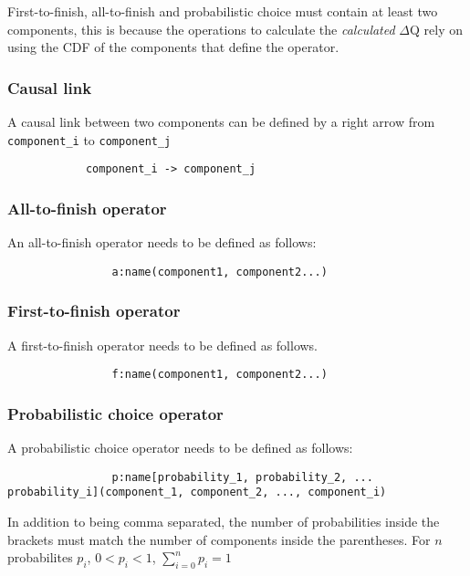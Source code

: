             First-to-finish, all-to-finish and probabilistic choice must contain at least two components, this is because the operations to calculate the \textit{calculated} $\Delta$Q rely on using the CDF of the components that define the operator.
            
        \subsubsection{Causal link}
            A causal link between two components can be defined by a right arrow from \texttt{component\_i} to \texttt{component\_j}
        \begin{verbatim}
            component_i -> component_j 
        \end{verbatim}
        
        \subsubsection{All-to-finish operator}
            An all-to-finish operator needs to be defined as follows:
            \begin{verbatim}
                a:name(component1, component2...)
            \end{verbatim}

        \subsubsection{First-to-finish operator}
            A first-to-finish operator needs to be defined as follows.
            \begin{verbatim}
                f:name(component1, component2...)
            \end{verbatim} 

        \subsubsection{Probabilistic choice operator}
            A probabilistic choice operator needs to be defined as follows:
            \begin{verbatim}
                p:name[probability_1, probability_2, ... probability_i](component_1, component_2, ..., component_i) 
            \end{verbatim}
            In addition to being comma separated, the number of probabilities inside the brackets must match the number of components inside the parentheses. For $n$ probabilites $p_i$, $0 < p_i < 1$, $\sum_{i = 0}^{n} p_i = 1$ 
        
